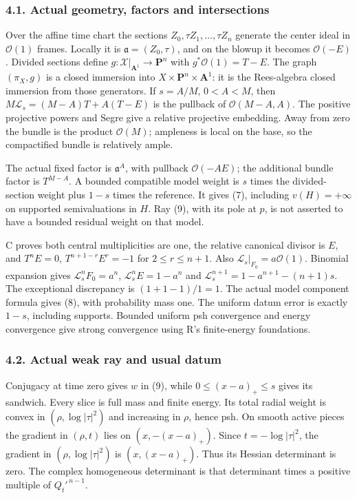 \documentclass[
  11pt,
]{article}
\begin{document}
\subsubsection{4.1. Actual geometry, factors and
intersections}\label{actual-geometry-factors-and-intersections}

Over the affine time chart the sections \(Z_0,\tau Z_1,\ldots,\tau Z_n\)
generate the center ideal in \(\mathcal O(1)\) frames. Locally it is
\(\mathfrak a=(Z_0,\tau)\), and on the blowup it becomes
\(\mathcal O(-E)\). Divided sections define
\(g:\mathcal X|_{\mathbf A^1}\to\mathbf P^n\) with
\(g^*\mathcal O(1)=T-E\). The graph \((\pi_X,g)\) is a closed immersion
into \(X\times\mathbf P^n\times\mathbf A^1\): it is the Rees-algebra
closed immersion from those generators. If \(s=A/M\), \(0<A<M\), then
\(M\mathcal L_s=(M-A)T+A(T-E)\) is the pullback of
\(\mathcal O(M-A,A)\). The positive projective powers and Segre give a
relative projective embedding. Away from zero the bundle is the product
\(\mathcal O(M)\); ampleness is local on the base, so the compactified
bundle is relatively ample.

The actual fixed factor is \(\mathfrak a^A\), with pullback
\(\mathcal O(-AE)\); the additional bundle factor is \(T^{M-A}\). A
bounded compatible model weight is \(s\) times the divided-section
weight plus \(1-s\) times the reference. It gives (7), including
\(v(H)=+\infty\) on supported semivaluations in \(H\). Ray (9), with its
pole at \(p\), is not asserted to have a bounded residual weight on that
model.

C proves both central multiplicities are one, the relative canonical
divisor is \(E\), and \(T^nE=0\), \(T^{n+1-r}E^r=-1\) for
\(2\le r\le n+1\). Also \(\mathcal L_s|_{F_0}=a\mathcal O(1)\). Binomial
expansion gives \(\mathcal L_s^nF_0=a^n\), \(\mathcal L_s^nE=1-a^n\) and
\(\mathcal L_s^{n+1}=1-a^{n+1}-(n+1)s\). The exceptional discrepancy is
\((1+1-1)/1=1\). The actual model component formula gives (8), with
probability mass one. The uniform datum error is exactly \(1-s\),
including supports. Bounded uniform psh convergence and energy
convergence give strong convergence using R's finite-energy foundations.

\subsubsection{4.2. Actual weak ray and usual
datum}\label{actual-weak-ray-and-usual-datum}

Conjugacy at time zero gives \(w\) in (9), while \(0\le(x-a)_+\le s\)
gives its sandwich. Every slice is full mass and finite energy. Its
total radial weight is convex in \((\rho,\log|\tau|^2)\) and increasing
in \(\rho\), hence psh. On smooth active pieces the gradient in
\((\rho,t)\) lies on \((x,-(x-a)_+)\). Since \(t=-\log|\tau|^2\),
the gradient in \((\rho,\log|\tau|^2)\) is \((x,(x-a)_+)\).
Thus its Hessian determinant is zero.
The complex homogeneous determinant is that determinant times a positive
multiple of \(Q_t'^{\,n-1}\).
\end{document}
